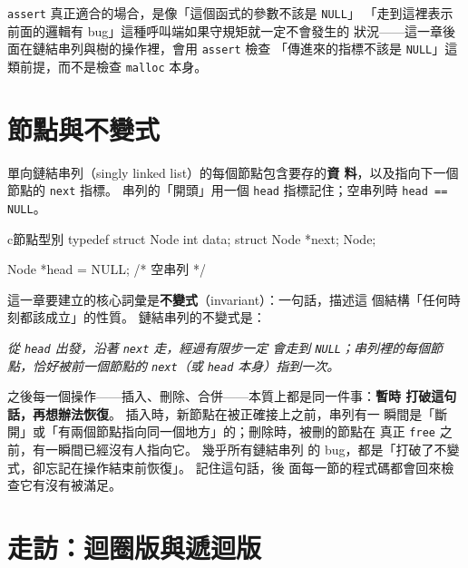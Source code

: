\texttt{assert} 真正適合的場合，是像「這個函式的參數不該是 \texttt{NULL}」
「走到這裡表示前面的邏輯有 bug」這種呼叫端如果守規矩就一定不會發生的
狀況——這一章後面在鏈結串列與樹的操作裡，會用 \texttt{assert} 檢查
「傳進來的指標不該是 \texttt{NULL}」這類前提，而不是檢查
\texttt{malloc} 本身。


\section{節點與不變式}
\label{sec:ds-node-invariant}

單向鏈結串列（singly linked list）的每個節點包含要存的\textbf{資
料}，以及指向下一個節點的 \texttt{next} 指標。 串列的「開頭」用一個
\texttt{head} 指標記住；空串列時 \texttt{head == NULL}。

\begin{code}{c}{節點型別}
typedef struct Node {
    int data;
    struct Node *next;
} Node;

Node *head = NULL;  /* 空串列 */
\end{code}

這一章要建立的核心詞彙是\textbf{不變式}（invariant）：一句話，描述這
個結構「任何時刻都該成立」的性質。 鏈結串列的不變式是：

\begin{center}
\itshape 從 \texttt{head} 出發，沿著 \texttt{next} 走，經過有限步一定
會走到 \texttt{NULL}；串列裡的每個節點，恰好被前一個節點的
\texttt{next}（或 \texttt{head} 本身）指到一次。
\end{center}

之後每一個操作——插入、刪除、合併——本質上都是同一件事：\textbf{暫時
打破這句話，再想辦法恢復}。 插入時，新節點在被正確接上之前，串列有一
瞬間是「斷開」或「有兩個節點指向同一個地方」的；刪除時，被刪的節點在
真正 \texttt{free} 之前，有一瞬間已經沒有人指向它。 幾乎所有鏈結串列
的 bug，都是「打破了不變式，卻忘記在操作結束前恢復」。 記住這句話，後
面每一節的程式碼都會回來檢查它有沒有被滿足。


\section{走訪：迴圈版與遞迴版}
\label{sec:ds-traverse}

